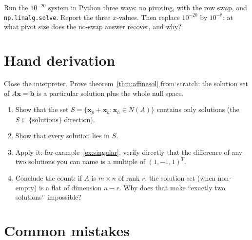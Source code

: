 \begin{exercise}[hard]
Run the $10^{-20}$ system in Python three ways: no pivoting, with the row swap, and \texttt{np.linalg.solve}. Report the three $x$-values. Then replace $10^{-20}$ by $10^{-8}$: at what pivot size does the no-swap answer recover, and why?
\end{exercise}

\section{Hand derivation}\label{sec:handderiv}

Close the interpreter. Prove theorem~\ref{thm:affinesol} from scratch: the solution set of $A\mathbf{x}=\mathbf{b}$ is a particular solution plus the whole null space.
\begin{enumerate}
  \item Show that the set $S=\{\mathbf{x}_p+\mathbf{x}_h:\mathbf{x}_h\in N(A)\}$ contains only solutions (the $S\subseteq\{\text{solutions}\}$ direction).
  \item Show that every solution lies in $S$.
  \item Apply it: for example~\ref{ex:singular}, verify directly that the difference of any two solutions you can name is a multiple of $(1,-1,1)^{T}$.
  \item Conclude the count: if $A$ is $m\times n$ of rank $r$, the solution set (when non-empty) is a flat of dimension $n-r$. Why does that make ``exactly two solutions'' impossible?
\end{enumerate}

\section{Common mistakes}\label{sec:mistakes}

